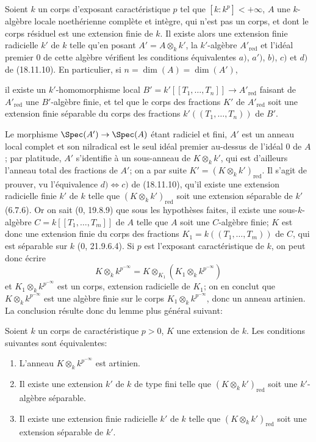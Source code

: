 \begin{corollary}[18.11.12]
\label{IV.18.11.12}
Soient $k$ un corps d'exposant caractéristique $p$ tel que $[k:k^p]<+\infty$, $A$ une $k$-algèbre locale noethérienne complète et intègre, qui n'est pas un corps, et dont le corps résiduel est une extension finie de $k$. Il existe alors une extension finie radicielle $k'$ de $k$ telle qu'en posant $A'=A\otimes_k k'$, la $k'$-algèbre $A'_{\mathrm{red}}$ et l'idéal premier $0$ de cette algèbre vérifient les conditions équivalentes $a)$, $a')$, $b)$, $c)$ et $d)$ de (18.11.10). En particulier, si $n=\dim(A)=\dim(A')$,


il existe un $k'$-homomorphisme local $B'=k'[[T_1,\ldots,T_n]]\to A'_{\mathrm{red}}$ faisant de $A'_{\mathrm{red}}$ une $B'$-algèbre finie, et tel que le corps des fractions $K'$ de $A'_{\mathrm{red}}$ soit une extension finie séparable du corps des fractions $k'((T_1,\ldots,T_n))$ de $B'$.
\end{corollary}

Le morphisme $\Spec(A')\to\Spec(A)$ étant radiciel et fini, $A'$ est un anneau local complet et son nilradical est le seul idéal premier au-dessus de l'idéal $0$ de $A$; par platitude, $A'$ s'identifie à un sous-anneau de $K\otimes_k k'$, qui est d'ailleurs l'anneau total des fractions de $A'$; on a par suite $K'=(K\otimes_k k')_{\mathrm{red}}$. Il s'agit de prouver, vu l'équivalence $d)\Leftrightarrow c)$ de (18.11.10), qu'il existe une extension radicielle finie $k'$ de $k$ telle que $(K\otimes_k k')_{\mathrm{red}}$ soit une extension séparable de $k'$ (6.7.6). Or on sait (0, 19.8.9) que sous les hypothèses faites, il existe une sous-$k$-algèbre $C=k[[T_1,\ldots,T_m]]$ de $A$ telle que $A$ soit une $C$-algèbre finie; $K$ est donc une extension finie du corps des fractions $K_1=k((T_1,\ldots,T_m))$ de $C$, qui est séparable sur $k$ (0, 21.9.6.4). Si $p$ est l'exposant caractéristique de $k$, on peut donc écrire
\[
  K\otimes_k k^{p^{-\infty}}=K\otimes_{K_1}(K_1\otimes_k k^{p^{-\infty}})
\]
et $K_1\otimes_k k^{p^{-\infty}}$ est un corps, extension radicielle de $K_1$; on en conclut que $K\otimes_k k^{p^{-\infty}}$ est une algèbre finie sur le corps $K_1\otimes_k k^{p^{-\infty}}$, donc un anneau artinien. La conclusion résulte donc du lemme plus général suivant:

\begin{lemma}[18.11.12.1]
\label{IV.18.11.12.1}
Soient $k$ un corps de caractéristique $p>0$, $K$ une extension de $k$. Les conditions suivantes sont équivalentes:
\begin{enumerate}
  \item[$a)$] L'anneau $K\otimes_k k^{p^{-\infty}}$ est artinien.
  \item[$b)$] Il existe une extension $k'$ de $k$ de type fini telle que $(K\otimes_k k')_{\mathrm{red}}$ soit une $k'$-algèbre séparable.
  \item[$c)$] Il existe une extension finie radicielle $k'$ de $k$ telle que $(K\otimes_k k')_{\mathrm{red}}$ soit une extension séparable de $k'$.
\end{enumerate}
\end{lemma}

